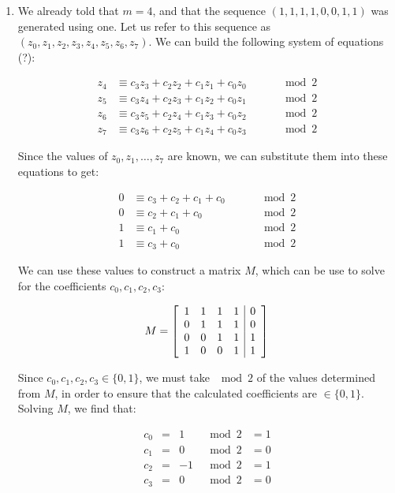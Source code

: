 \documentclass[11pt]{article}
\theoremstyle{definition}
\begin{document}
\begin{enumerate}
\begin{enumerate}
\item We already told that $m = 4$, and that the sequence $(1, 1, 1, 1, 0, 0, 1, 1)$ was generated using one. Let us refer to this sequence as $(z_0, z_1, z_2, z_3, z_4, z_5, z_6, z_7)$. We can build the following system of equations (?):

\begin{align*}
z_4 &\equiv c_3  z_3 + c_2  z_2 + c_1  z_1 + c_0  z_0 \qquad &\mod{2}\\
z_5 &\equiv c_3  z_4 + c_2  z_3 + c_1  z_2 + c_0  z_1 \qquad &\mod{2}\\
z_6 &\equiv c_3  z_5 + c_2  z_4 + c_1  z_3 + c_0  z_2 \qquad &\mod{2}\\
z_7 &\equiv c_3  z_6 + c_2  z_5 + c_1  z_4 + c_0  z_3 \qquad &\mod{2}
\end{align*}

Since the values of $z_0, z_1, \ldots , z_7$ are known, we can substitute them into these equations to get:

\begin{align*}
0 &\equiv c_3 + c_2 + c_1 + c_0 \qquad &\mod{2}\\
0 &\equiv c_2 + c_1 + c_0 \qquad &\mod{2}\\
1 &\equiv c_1 + c_0 \qquad &\mod{2}\\
1 &\equiv c_3 + c_0 \qquad &\mod{2}
\end{align*}

We can use these values to construct a matrix $M$, which can be use to solve for the coefficients $c_0, c_1, c_2, c_3$:

\[
  M=
  \left[ {\begin{array}{cccc | c}
   1 & 1 & 1 & 1 & 0\\
   0 & 1 & 1 & 1 & 0\\
   0 & 0 & 1 & 1 & 1\\
   1 & 0 & 0 & 1 & 1\\
  \end{array} } \right]
\]

Since $c_0, c_1, c_2, c_3 \in \{0 , 1\}$, we must take $\mod{2}$ of the values determined from $M$, in order to ensure that the calculated coefficients are $\in \{0, 1\}$.\\

Solving $M$, we find that:

\begin{align*}
c_0 &= &1 &\mod{2} &= 1\\
c_1 &= &0 &\mod{2} &= 0\\
c_2 &= &-1 &\mod{2} &= 1\\
c_3 &= &0 &\mod{2} &= 0
\end{align*}


\end{enumerate}
\end{enumerate}
\end{document}
